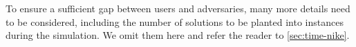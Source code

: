 To ensure a sufficient gap between users and adversaries, many more details need to be considered, including the number of solutions to be planted into instances during the simulation. We omit them here and refer the reader to \cref{sec:time-nike}.



%
